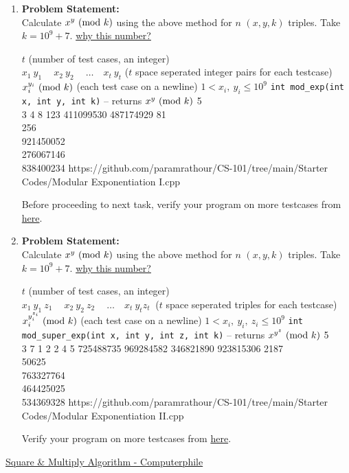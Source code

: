 \begin{enumerate}[label=(\alph*)]
\item 
\textbf{Problem Statement:}\\
Calculate $x^y\ (\mathrm{mod}\ k)$ using the above method for $n$ $(x,y,k)$ triples. Take $k=10^9+7$. \href{https://www.geeksforgeeks.org/modulo-1097-1000000007/}{why this number?}
\begin{testcasesFunction}
	{$t$ \hfill(number of test cases, an integer)\\
	$x_1\ y_1\ \quad x_2\ y_2\ \quad \ldots\quad x_t\ y_t$ \hfill($t$ space seperated integer pairs for each testcase)}
	{$x_i^{y_i} \ (\mathrm{mod}\ k)$ \hfill(each test case on a newline)}
	{$1 < x_i,\ y_i \leq 10^{9}$}
	{\texttt{int mod\_exp(int x, int y, int k)} -- returns $x^y \ (\mathrm{mod}\ k)$}
	{5\\3 4 8 123 411099530 487174929}
	{81\\256\\921450052\\276067146\\838400234}
	{https://github.com/paramrathour/CS-101/tree/main/Starter Codes/Modular Exponentiation I.cpp}
\end{testcasesFunction}
\begin{note}
	Before proceeding to next task, verify your program on more testcases from \href{https://cses.fi/problemset/task/1095}{here}.
\end{note}
\item 
\textbf{Problem Statement:}\\
Calculate $x^y\ (\mathrm{mod}\ k)$ using the above method for $n$ $(x,y,k)$ triples. Take $k=10^9+7$. \href{https://www.geeksforgeeks.org/modulo-1097-1000000007/}{why this number?}
\begin{testcasesFunction}
	{$t$ \hfill(number of test cases, an integer)\\
	$x_1\ y_1\ z_1\ \quad x_2\ y_2\ z_2\ \quad \ldots\quad x_t\ y_t z_t\ $ \hfill($t$ space seperated triples for each testcase)}
	{$x_i^{y_{i}^{z_i}} \ (\mathrm{mod}\ k)$ \hfill(each test case on a newline)}
	{$1 < x_i,\ y_i,\ z_i \leq 10^{9}$}
	{\texttt{int mod\_super\_exp(int x, int y, int z, int k)} -- returns $x^{y^z} \ (\mathrm{mod}\ k)$}
	{5\\3 7 1 2 2 4 5 725488735 969284582 346821890 923815306}
	{2187\\50625\\763327764\\464425025\\534369328}
	{https://github.com/paramrathour/CS-101/tree/main/Starter Codes/Modular Exponentiation II.cpp}
\end{testcasesFunction}
\begin{note}
	Verify your program on more testcases from \href{https://cses.fi/problemset/task/1712}{here}.
\end{note}
\end{enumerate}
\begin{funvideo}
\href{https://youtu.be/cbGB__V8MNk}{Square \& Multiply Algorithm - Computerphile}
\end{funvideo}
\recalctypearea